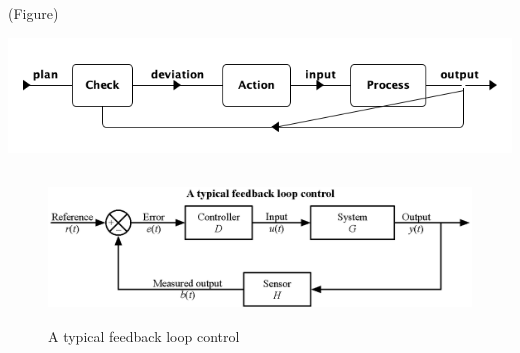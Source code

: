 \documentclass{article}
\begin{document}
(Figure)


\begin{center}
\includegraphics[width=.9\linewidth]{Figures/system_feedback_loop.png}
\end{center}







\begin{figure}[htbp]
\centering
\includegraphics[height=150]{./Figures/A_typical_feedback_loop_control.eps}
\caption{\label{fig:orgfc7587d}A typical feedback loop control}
\end{figure}
\end{document}
